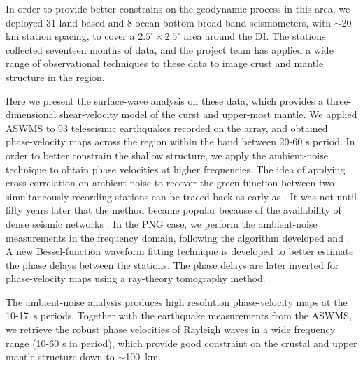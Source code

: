 \documentclass[12pt,oneside]{book}
\begin{document}
In order to provide better constrains on the geodynamic process in this area, we deployed 31 land-based and 8 ocean bottom broad-band seismometers, with $\sim$20-km station spacing, to cover a $2.5^\circ \times 2.5^\circ$ area around the DI. The stations collected seventeen months of data, and the project team has applied a wide range of observational techniques to these data to image crust and mantle structure in the region.

Here we present the surface-wave analysis on these data, which provides a three-dimensional shear-velocity model of the curst and upper-most mantle. We applied ASWMS to 93 teleseismic earthquakes recorded on the array, and obtained phase-velocity maps across the region within the band between 20-60 s period.
In order to better constrain the shallow structure, we apply the ambient-noise technique to obtain phase velocities at higher frequencies.
The idea of applying cross correlation on ambient noise to recover the green function between two simultaneously recording stations can be traced back as early as \citet{Aki:1957un}. 
It was not until fifty years later that the method became popular because of the availability of dense seismic networks \citep[e.g.][]{Shapiro:2005kz,Bensen:2007hl}. 
In the PNG case, we perform the ambient-noise measurements in the frequency domain, following the algorithm developed \citet{Ekstrom:2009iv} and \citet{Ekstrom:2013dr}. 
A new Bessel-function waveform fitting technique is developed to better estimate the phase delays between the stations. The phase delays are later inverted for phase-velocity maps using a ray-theory tomography method.

The ambient-noise analysis produces high resolution phase-velocity maps at the 10-17~s periods. Together with the earthquake measurements from the ASWMS, we retrieve the robust phase velocities of Rayleigh waves in a wide frequency range (10-60 s in period), which provide good constraint on the crustal and upper mantle structure down to $\sim$100~km.
\end{document}

